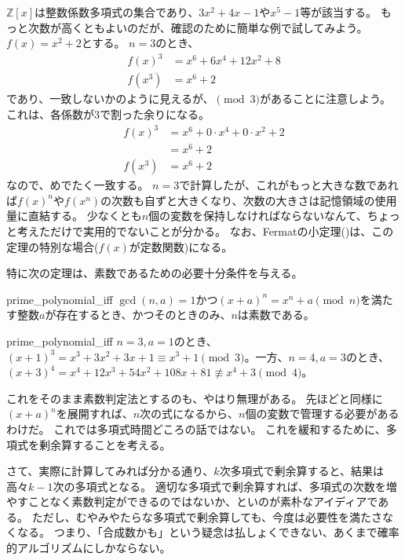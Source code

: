 $\mathbb{Z}[x]$は整数係数多項式の集合であり、$3x^2+4x-1$や$x^5-1$等が該当する。
もっと次数が高くともよいのだが、確認のために簡単な例で試してみよう。
$f(x) = x^2 + 2$とする。
$n=3$のとき、
\begin{align*}
f(x)^3 &= x^6 + 6x^4 + 12x^2 + 8\\
f(x^3) &= x^6 + 2
\end{align*}
であり、一致しないかのように見えるが、$\pmod{3}$があることに注意しよう。
これは、各係数が3で割った余りになる。
\begin{align*}
f(x)^3 &= x^6 + 0 \cdot x^4 + 0\cdot x^2 + 2\\
&= x^6 + 2\\
f(x^3) &= x^6 + 2
\end{align*}
なので、めでたく一致する。
$n=3$で計算したが、これがもっと大きな数であれば$f(x)^n$や$f(x^n)$の次数も自ずと大きくなり、次数の大きさは記憶領域の使用量に直結する。
少なくとも$n$個の変数を保持しなければならないなんて、ちょっと考えただけで実用的でないことが分かる。
なお、Fermatの小定理()は、この定理の特別な場合($f(x)$が定数関数)になる。

特に次の定理は、素数であるための必要十分条件を与える。

\begin{Theo}{}{prime_polynomial_iff}
$\gcd(n,a)=1$かつ$(x+a)^n = x^n + a \pmod{n}$を満たす整数$a$が存在するとき、かつそのときのみ、$n$は素数である。
\end{Theo}

\begin{Exam}{}{prime_polynomial_iff}
$n=3,a=1$のとき、$(x+1)^3=x^3+3x^2+3x+1\equiv x^3+1\pmod{3}$。一方、$n=4,a=3$のとき、$(x+3)^4=x^4+12x^3+54x^2+108x+81\not\equiv x^4+3\pmod{4}$。
\end{Exam}

これをそのまま素数判定法とするのも、やはり無理がある。
先ほどと同様に$(x+a)^n$を展開すれば、$n$次の式になるから、$n$個の変数で管理する必要があるわけだ。
これでは多項式時間どころの話ではない。
これを緩和するために、多項式を剰余算することを考える。

さて、実際に計算してみれば分かる通り、$k$次多項式で剰余算すると、結果は高々$k-1$次の多項式となる。
適切な多項式で剰余算すれば、多項式の次数を増やすことなく素数判定ができるのではないか、といのが素朴なアイディアである。
ただし、むやみやたらな多項式で剰余算しても、今度は必要性を満たさなくなる。
つまり、「合成数かも」という疑念は払しょくできない、あくまで確率的アルゴリズムにしかならない。

